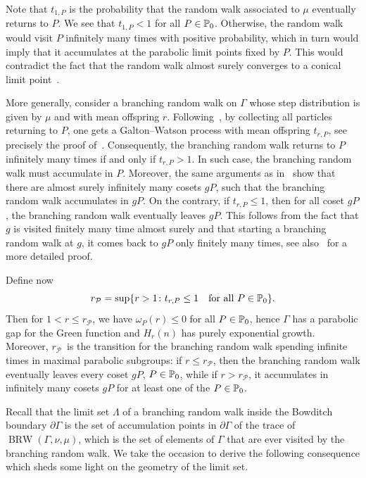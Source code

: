 \documentclass[AHL,Unicode,longabstracts]{cedram}
\newcommand{\bbP}{\mathbb{P}}
\newcommand{\clP}{\mathcal{P}}
\DeclareMathOperator{\BRW}{BRW}
\let\oldin\in
\renewcommand{\in}{\mathchoice{\oldin}{\oldin}{\,\oldin\,}{\,\oldin\,}}
\begin{document}
Note that $t_{1, P}$ is the probability that the random walk associated to $\mu$ eventually returns to $P$. We see that $t_{1, P} < 1$ for all $P \in \bbP_0$. Otherwise, the random walk would visit $P$ infinitely many times with positive probability, which in turn would imply that it accumulates at the parabolic limit points fixed by $P$. This would contradict the fact that the random walk almost surely converges to a conical limit point~\cite[Theorem~9.14]{GGPY}.



More generally, consider a branching random walk on $\Gamma$ whose step distribution is given by $\mu$ and with mean offspring $r$. Following~\cite{CandelleroGilchMuller}, by collecting all particles returning to $P$, one gets a Galton--Watson process with mean offspring $t_{r,P}$, see precisely the proof of~\cite[Proposition~4.3]{CandelleroGilchMuller}. Consequently, the branching random walk returns to $P$ infinitely many times if and only if $t_{r,P}>1$. In such case, the branching random walk must accumulate in $P$. Moreover, the same arguments as in~\cite[Proposition~4.4]{CandelleroGilchMuller} show that there are almost surely infinitely many cosets $gP$, such that the branching random walk accumulates in $gP$. On the contrary, if $t_{r,P}\leq 1$, then for all coset $gP$, the branching random walk eventually leaves $gP$. This follows from the fact that $g$ is visited finitely many time almost surely and that starting a branching random walk at $g$, it comes back to $gP$ only finitely many times, see also~\cite[Proposition~4.5]{CandelleroGilchMuller} for a more detailed proof.

Define now
\[
r_{\clP} = \sup \{ r > 1 \colon t_{r, P} \leq 1 \quad\text{for all } P \in \bbP_0 \}.
\]
Then for $1<r\leq r_\clP$, we have $\omega_P(r)\leq 0$ for all $P\in \bbP_0$, hence $\Gamma$ has a parabolic gap for the Green function and $H_r(n)$ has purely exponential growth. Moreover, $r_\clP$~is the transition for the branching random walk spending infinite times in maximal parabolic subgroups: if $r \leq r_\clP$, then the branching random walk eventually leaves every coset $gP$, $P\in \bbP_0$, while if $r>r_\clP$, it accumulates in infinitely many cosets $gP$ for at least one of the $P\in \bbP_0$.

Recall that the limit set $\Lambda$ of a branching random walk inside the Bowditch boundary $\partial\Gamma$ is the set of accumulation points in $\partial\Gamma$ of the trace of $\BRW(\Gamma,\nu,\mu)$, which is the set of elements of $\Gamma$ that are ever visited by the branching random walk. We take the occasion to derive the following consequence which sheds some light on the geometry of the limit set.
\end{document}
